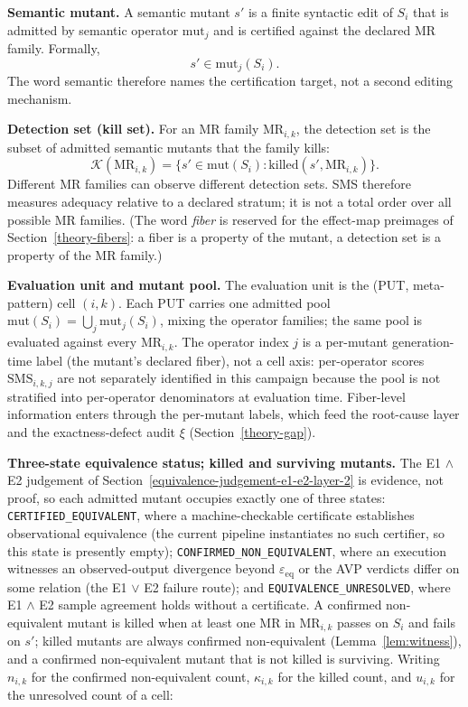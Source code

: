 \documentclass[manuscript,screen,review]{acmart}
\begin{document}
\textbf{Semantic mutant.} A semantic mutant \(s'\) is a finite syntactic
edit of \(S_i\) that is admitted by semantic operator \(\mathrm{mut}_j\)
and is certified against the declared MR family. Formally,
\[
  s' \in \mathrm{mut}_j(S_i).
\]
The word semantic therefore names the certification target, not a second
editing mechanism.

\textbf{Detection set (kill set).} For an MR family \(\mathrm{MR}_{i,k}\),
the detection set is the subset of admitted semantic mutants
that the family kills:
\[
  \mathcal{K}(\mathrm{MR}_{i,k}) =
  \{s' \in \mathrm{mut}(S_i): \mathrm{killed}(s', \mathrm{MR}_{i,k})\}.
\]
Different MR families can observe different detection sets. SMS therefore
measures adequacy relative to a declared stratum; it is not a total order
over all possible MR families. (The word \emph{fiber} is reserved for
the effect-map preimages of Section~\ref{theory-fibers}: a fiber is a
property of the mutant, a detection set is a property of the MR family.)

\textbf{Evaluation unit and mutant pool.} The evaluation unit is the
(PUT, meta-pattern) cell \((i,k)\). Each PUT carries one admitted pool
\(\mathrm{mut}(S_i) = \bigcup_j \mathrm{mut}_j(S_i)\), mixing the
operator families; the same pool is evaluated against every
\(\mathrm{MR}_{i,k}\). The operator index \(j\) is a per-mutant
generation-time label (the mutant's declared fiber), not a cell axis:
per-operator scores \(\mathrm{SMS}_{i,k,j}\) are not separately
identified in this campaign because the pool is not stratified into
per-operator denominators at evaluation time. Fiber-level information
enters through the per-mutant labels, which feed the root-cause layer
and the exactness-defect audit \(\xi\) (Section~\ref{theory-gap}).

\textbf{Three-state equivalence status; killed and surviving mutants.}
The E1 $\wedge$ E2 judgement of Section~\ref{equivalence-judgement-e1-e2-layer-2} is evidence, not proof, so
each admitted mutant occupies exactly one of three states:
\texttt{CERTIFIED\_EQUIVALENT}, where a machine-checkable certificate
establishes observational equivalence (the current pipeline instantiates
no such certifier, so this state is presently empty);
\texttt{CONFIRMED\_NON\_EQUIVALENT}, where an execution witnesses an
observed-output divergence beyond $\varepsilon_{\mathrm{eq}}$ or the AVP
verdicts differ on some relation (the E1 $\vee$ E2 failure route); and
\texttt{EQUIVALENCE\_UNRESOLVED}, where E1 $\wedge$ E2 sample agreement
holds without a certificate. A confirmed non-equivalent mutant is killed
when at least one MR in \(\mathrm{MR}_{i,k}\) passes on \(S_i\) and
fails on \(s'\); killed mutants are always confirmed non-equivalent
(Lemma~\ref{lem:witness}), and a confirmed non-equivalent mutant that is
not killed is surviving. Writing \(n_{i,k}\) for the confirmed
non-equivalent count, \(\kappa_{i,k}\) for the killed count, and
\(u_{i,k}\) for the unresolved count of a cell:
\end{document}
